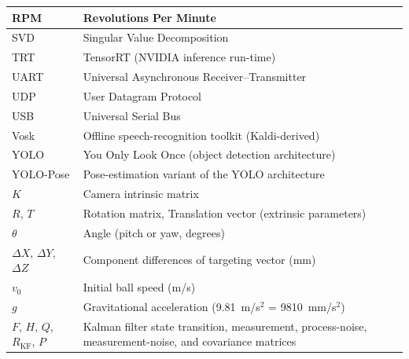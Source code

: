 \begin{longtable}{|p{3.5cm}|p{9cm}|}
\hline
RPM & Revolutions Per Minute \\
\hline
SVD & Singular Value Decomposition \\
\hline
TRT & TensorRT (NVIDIA inference run-time) \\
\hline
UART & Universal Asynchronous Receiver--Transmitter \\
\hline
UDP & User Datagram Protocol \\
\hline
USB & Universal Serial Bus \\
\hline
Vosk & Offline speech-recognition toolkit (Kaldi-derived) \\
\hline
YOLO & You Only Look Once (object detection architecture) \\
\hline
YOLO-Pose & Pose-estimation variant of the YOLO architecture \\
\hline
$K$ & Camera intrinsic matrix \\
\hline
$R$, $T$ & Rotation matrix, Translation vector (extrinsic parameters) \\
\hline
$\theta$ & Angle (pitch or yaw, degrees) \\
\hline
$\Delta X$, $\Delta Y$, $\Delta Z$ & Component differences of targeting vector (mm) \\
\hline
$v_{0}$ & Initial ball speed (m/s) \\
\hline
$g$ & Gravitational acceleration (9.81~m/s$^2$ = 9810~mm/s$^2$) \\
\hline
$F$, $H$, $Q$, $R_{\text{KF}}$, $P$ & Kalman filter state transition, measurement, process-noise, measurement-noise, and covariance matrices \\
\hline
\end{longtable}
